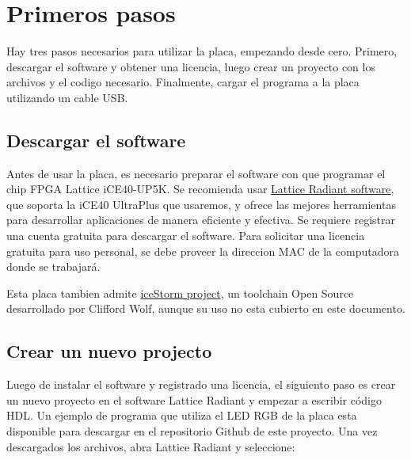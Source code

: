 \documentclass[11pt, a4paper, oneside]{article}
\begin{document}
\section{Primeros pasos}
Hay tres pasos necesarios para utilizar la placa, empezando desde cero. Primero, descargar el software y obtener una licencia, luego crear un proyecto con los archivos y el codigo necesario. Finalmente, cargar el programa a la placa utilizando un cable USB.

\subsection{Descargar el software}

Antes de usar la placa, es necesario preparar el software con que programar el chip FPGA Lattice iCE40-UP5K. Se recomienda usar \href{http://www.latticesemi.com/Products/DesignSoftwareAndIP/FPGAandLDS/Radiant}{Lattice Radiant software}, que soporta la iCE40 UltraPlus que usaremos, y ofrece las mejores herramientas para desarrollar aplicaciones de manera eficiente y efectiva. Se requiere registrar una cuenta gratuita para descargar el software. Para solicitar una licencia gratuita para uso personal, se debe proveer la direccion MAC de la computadora donde se trabajará.

Esta placa tambien admite \href{http://www.clifford.at/icestorm/}{iceStorm project}, un toolchain Open Source desarrollado por Clifford Wolf, aunque su uso no esta cubierto en este documento.

\subsection{Crear un nuevo projecto}
Luego de instalar el software y registrado una licencia, el siguiento paso es crear un nuevo proyecto en el software Lattice Radiant y empezar a escribir código HDL. Un ejemplo de programa que utiliza el LED RGB de la placa esta disponible para descargar en el repositorio Github de este proyecto. Una vez descargados los archivos, abra Lattice Radiant y seleccione:
\end{document}
